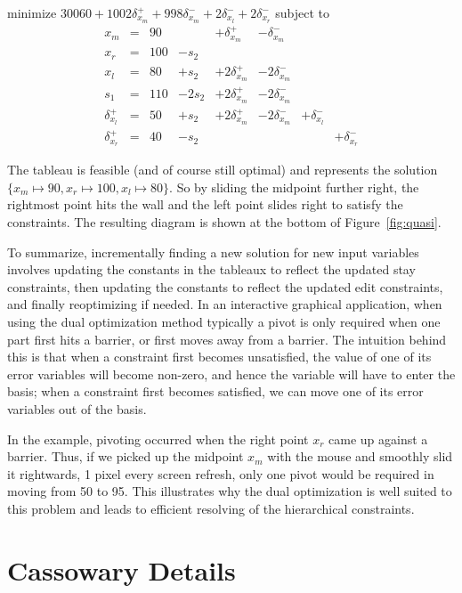 \documentclass{article}
\begin{document}
\begin{trivlist}\item
minimize $30060 + 1002 \delta_{x_m}^+ + 998 \delta_{x_m}^-  + 2
\delta_{x_l}^- + 2\delta_{x_r}^- $ 
subject to 
$$
\begin{array}{rlrrrrrr} 
x_m & = &90 & & + \delta_{x_m}^+ & - \delta_{x_m}^- \\
x_r & = &100 & - s_2 \\ \hline
x_l & = & 80 & + s_2 & + 2 \delta_{x_m}^+ & - 2 \delta_{x_m}^- \\
s_1 & = &110 & - 2 s_2 & + 2 \delta_{x_m}^+ & - 2\delta_{x_m}^- \\
\delta_{x_l}^+ & = & 50 & + s_2 & + 2 \delta_{x_m}^+ & - 2\delta_{x_m}^- &
		+ \delta_{x_l}^- \\
\delta_{x_r}^+ & = & 40 & - s_2 &&&&  +\delta_{x_r}^-
\end{array}
$$
\end{trivlist}
The tableau is feasible (and of course still
optimal) and represents the solution
$\{x_m \mapsto 90, x_r \mapsto 100, x_l \mapsto 80\}$.
So by sliding the midpoint further right, the rightmost point hits the wall
and the left point slides right to satisfy the constraints.
The resulting diagram is shown at the bottom of Figure~\ref{fig:quasi}.

To summarize, incrementally finding a new solution for new input variables
involves updating the constants in the tableaux to reflect the updated stay
constraints, then updating the constants to reflect the updated edit
constraints, and finally reoptimizing if needed.  In an interactive
graphical application, when using the dual optimization method typically a
pivot is only required when one part first hits a barrier, or first moves
away from a barrier.  The intuition behind this is that
when a constraint
first becomes unsatisfied, the value of one of its error variables will
become non-zero, and hence the variable will have to enter the basis;
when a constraint first becomes satisfied,
we can move one of its error variables out of the basis.

In the example, pivoting occurred when the right point $x_r$ came up against a
barrier.  Thus, if we picked up the midpoint $x_m$ with the mouse and
smoothly slid it rightwards, 1 pixel every screen refresh, only one pivot
would be required in moving from 50 to 95.  This illustrates why the dual
optimization is well suited to this problem and leads to efficient
resolving of the hierarchical constraints.

\section{Cassowary Details}
\label{cassowary-details}
\end{document}
